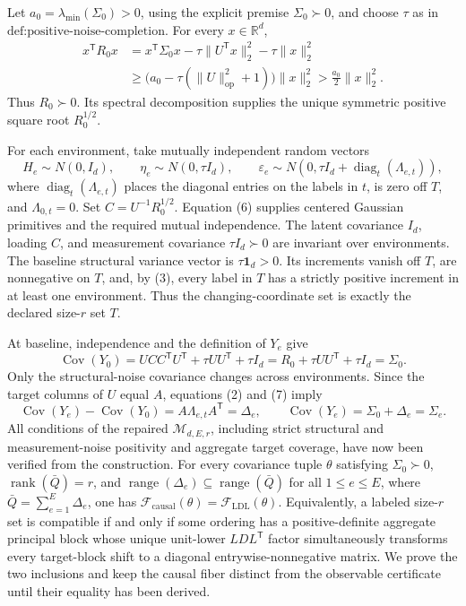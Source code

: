 Let \(a_0=\lambda_{\min}(\Sigma_0)>0\), using the explicit premise \(\Sigma_0\succ0\), and choose \(\tau\) as in \(\text{def:positive-noise-completion}\).  For every \(x\in\mathbb R^d\),
\[
 \begin{aligned}
 x^{\mathsf T}R_0x
 &=x^{\mathsf T}\Sigma_0x-\tau\lVert U^{\mathsf T}x\rVert_2^2-\tau\lVert x\rVert_2^2\\
 &\ge\bigl(a_0-\tau(\lVert U\rVert_{\mathrm{op}}^2+1)\bigr)\lVert x\rVert_2^2
 >\frac{a_0}{2}\lVert x\rVert_2^2.
 \end{aligned} \tag{5}
\]
Thus \(R_0\succ0\).  Its spectral decomposition supplies the unique symmetric positive square root \(R_0^{1/2}\).

For each environment, take mutually independent random vectors
\[
 H_e\sim N(0,I_d),\qquad
 \eta_e\sim N(0,\tau I_d),\qquad
 \varepsilon_e\sim N\!\left(0,\tau I_d+
 \operatorname{diag}_t(\Lambda_{e,t})\right), \tag{6}
\]
where \(\operatorname{diag}_t(\Lambda_{e,t})\) places the diagonal entries on the labels in \(t\), is zero off \(T\), and \(\Lambda_{0,t}=0\).  Set \(C=U^{-1}R_0^{1/2}\).  Equation (6) supplies centered Gaussian primitives and the required mutual independence.  The latent covariance \(I_d\), loading \(C\), and measurement covariance \(\tau I_d\succ0\) are invariant over environments.  The baseline structural variance vector is \(\tau\mathbf 1_d>0\).  Its increments vanish off \(T\), are nonnegative on \(T\), and, by (3), every label in \(T\) has a strictly positive increment in at least one environment.  Thus the changing-coordinate set is exactly the declared size-\(r\) set \(T\).

At baseline, independence and the definition of \(Y_e\) give
\[
 \operatorname{Cov}(Y_0)
 =UCC^{\mathsf T}U^{\mathsf T}+\tau UU^{\mathsf T}+\tau I_d
 =R_0+\tau UU^{\mathsf T}+\tau I_d=\Sigma_0. \tag{7}
\]
Only the structural-noise covariance changes across environments.  Since the target columns of \(U\) equal \(A\), equations (2) and (7) imply
\[
 \operatorname{Cov}(Y_e)-\operatorname{Cov}(Y_0)
 =A\Lambda_{e,t}A^{\mathsf T}=\Delta_e,
 \qquad
 \operatorname{Cov}(Y_e)=\Sigma_0+\Delta_e=\Sigma_e. \tag{8}
\]
All conditions of the repaired \(\mathcal M_{d,E,r}\), including strict structural and measurement-noise positivity and aggregate target coverage, have now been verified from the construction.
For every covariance tuple \(\theta\) satisfying \(\Sigma_0\succ0\), \(\operatorname{rank}(\bar Q)=r\), and \(\operatorname{range}(\Delta_e)\subseteq\operatorname{range}(\bar Q)\) for all \(1\le e\le E\), where \(\bar Q=\sum_{e=1}^E\Delta_e\), one has \(\mathcal F_{\mathrm{causal}}(\theta)=\mathcal F_{\mathrm{LDL}}(\theta)\).  Equivalently, a labeled size-\(r\) set is compatible if and only if some ordering has a positive-definite aggregate principal block whose unique unit-lower \(LDL^{\mathsf T}\) factor simultaneously transforms every target-block shift to a diagonal entrywise-nonnegative matrix.
We prove the two inclusions and keep the causal fiber distinct from the observable certificate until their equality has been derived.

